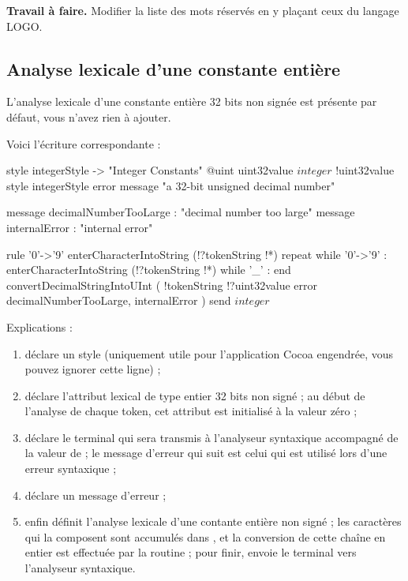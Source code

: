 \textbf{Travail à faire.} Modifier la liste des mots réservés en y plaçant ceux du langage LOGO.

\subsection{Analyse lexicale d'une constante entière}

L’analyse lexicale d’une constante entière 32 bits non signée est présente par défaut, vous n’avez rien à ajouter.

Voici l'écriture correspondante :
\begin{galgascode}
style integerStyle -> "Integer Constants"
@uint uint32value
$integer$ !uint32value style integerStyle
               error message "a 32-bit unsigned decimal number"

message decimalNumberTooLarge : "decimal number too large"
message internalError : "internal error"

rule '0'->'9' {
  enterCharacterIntoString (!?tokenString !*)
  repeat
  while '0'->'9' :
    enterCharacterIntoString (!?tokenString !*)
  while '_' :
  end
  convertDecimalStringIntoUInt (
    !tokenString
    !?uint32value
    error decimalNumberTooLarge, internalError
  )
  send $integer$
}
\end{galgascode}


Explications :
\begin{enumerate}
  \item {} déclare un style (uniquement utile pour l’application Cocoa engendrée, vous pouvez ignorer cette ligne) ;
  \item {} déclare l’attribut lexical  de type entier 32 bits non signé ; au début de l’analyse de chaque token, cet attribut est initialisé à la valeur zéro ;
  \item {} déclare le terminal  qui sera transmis à l’analyseur syntaxique accompagné de la valeur de  ;  le message d’erreur qui suit est celui qui est utilisé lors d’une erreur syntaxique ;
  \item {} déclare un message d’erreur ;
  \item enfin  définit l’analyse lexicale d’une contante entière non signé ; les caractères qui la composent sont accumulés dans , et la conversion de cette chaîne en entier est effectuée par la routine  ; pour finir,  envoie le terminal vers l’analyseur syntaxique.
\end{enumerate}


